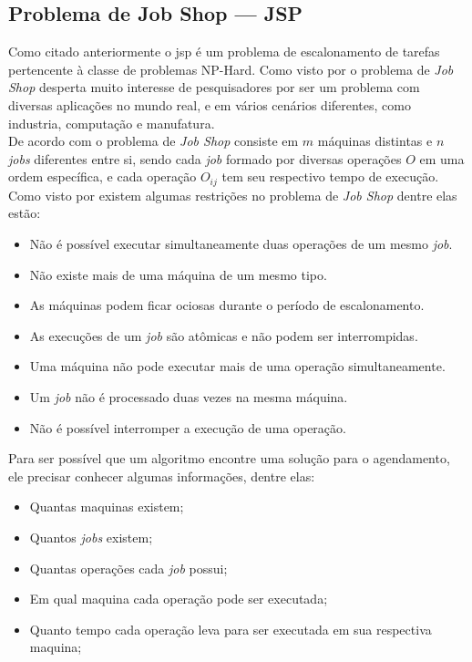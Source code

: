 \subsection{Problema de Job Shop — JSP}
Como citado anteriormente o \gls{jsp} é um problema de escalonamento de tarefas pertencente à classe de problemas NP-Hard. Como visto por \cite{Cheng1996} o problema de \textit{Job Shop} desperta muito interesse de pesquisadores por ser um problema com diversas aplicações no mundo real, e em vários cenários diferentes, como industria, computação e manufatura.\\
\indent De acordo com \cite{Cheng1996} o problema de \textit{Job Shop} consiste em $m$ máquinas distintas e $n$ \textit{jobs} diferentes entre si, sendo cada \textit{job} formado por diversas operações $O$ em uma ordem específica, e cada operação $O_{ij}$ tem seu respectivo tempo de execução.\\
\indent Como visto por \cite{Bagchi1999} existem algumas restrições no problema de \textit{Job Shop} dentre elas estão:
\begin{itemize}
    \item Não é possível executar simultaneamente duas operações de um mesmo \textit{job}.
    \item Não existe mais de uma máquina de um mesmo tipo.
    \item As máquinas podem ficar ociosas durante o período de escalonamento.
    \item As execuções de um \textit{job} são atômicas e não podem ser interrompidas.
    \item Uma máquina não pode executar mais de uma operação simultaneamente.
    \item Um \textit{job} não é processado duas vezes na mesma máquina.
    \item Não é possível interromper a execução de uma operação.
\end{itemize}
%


\indent Para ser possível que um algoritmo encontre uma solução para o agendamento, ele precisar conhecer algumas informações, dentre elas: 
\begin{itemize}
    \item Quantas maquinas existem;
    \item Quantos \textit{jobs} existem;
    \item Quantas operações cada \textit{job} possui;
    \item Em qual maquina cada operação pode ser executada;
    \item Quanto tempo cada operação leva para ser executada em sua respectiva maquina;
\end{itemize}


